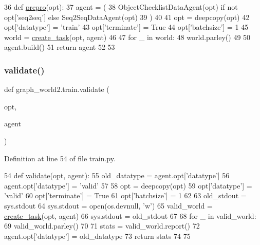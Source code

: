 \begin{DoxyCode}
36 \textcolor{keyword}{def }\hyperlink{namespacegraph__world2_1_1train_ac238655ccbc748146d1cbaaac96433a5}{prepro}(opt):
37     agent = (
38         ObjectChecklistDataAgent(opt) \textcolor{keywordflow}{if} \textcolor{keywordflow}{not} opt[\textcolor{stringliteral}{'seq2seq'}] \textcolor{keywordflow}{else} Seq2SeqDataAgent(opt)
39     )
40 
41     opt = deepcopy(opt)
42     opt[\textcolor{stringliteral}{'datatype'}] = \textcolor{stringliteral}{'train'}
43     opt[\textcolor{stringliteral}{'terminate'}] = \textcolor{keyword}{True}
44     opt[\textcolor{stringliteral}{'batchsize'}] = 1
45     world = \hyperlink{namespaceparlai_1_1core_1_1worlds_a11923c10b545c7ecc1b08fe2242d9c2c}{create\_task}(opt, agent)
46 
47     \textcolor{keywordflow}{for} \_ \textcolor{keywordflow}{in} world:
48         world.parley()
49 
50     agent.build()
51     \textcolor{keywordflow}{return} agent
52 
53 
\end{DoxyCode}
\mbox{\label{namespacegraph__world2_1_1train_aa00e41e1619128901ea053170fedef0b}} 
\subsubsection{\texorpdfstring{validate()}{validate()}}
{\footnotesize\ttfamily def graph\+\_\+world2.\+train.\+validate (\begin{DoxyParamCaption}\item[{}]{opt,  }\item[{}]{agent }\end{DoxyParamCaption})}



Definition at line 54 of file train.\+py.


\begin{DoxyCode}
54 \textcolor{keyword}{def }\hyperlink{namespacegraph__world2_1_1train_aa00e41e1619128901ea053170fedef0b}{validate}(opt, agent):
55     old\_datatype = agent.opt[\textcolor{stringliteral}{'datatype'}]
56     agent.opt[\textcolor{stringliteral}{'datatype'}] = \textcolor{stringliteral}{'valid'}
57 
58     opt = deepcopy(opt)
59     opt[\textcolor{stringliteral}{'datatype'}] = \textcolor{stringliteral}{'valid'}
60     opt[\textcolor{stringliteral}{'terminate'}] = \textcolor{keyword}{True}
61     opt[\textcolor{stringliteral}{'batchsize'}] = 1
62 
63     old\_stdout = sys.stdout
64     sys.stdout = open(os.devnull, \textcolor{stringliteral}{'w'})
65     valid\_world = \hyperlink{namespaceparlai_1_1core_1_1worlds_a11923c10b545c7ecc1b08fe2242d9c2c}{create\_task}(opt, agent)
66     sys.stdout = old\_stdout
67 
68     \textcolor{keywordflow}{for} \_ \textcolor{keywordflow}{in} valid\_world:
69         valid\_world.parley()
70 
71     stats = valid\_world.report()
72     agent.opt[\textcolor{stringliteral}{'datatype'}] = old\_datatype
73     \textcolor{keywordflow}{return} stats
74 
75 
\end{DoxyCode}



